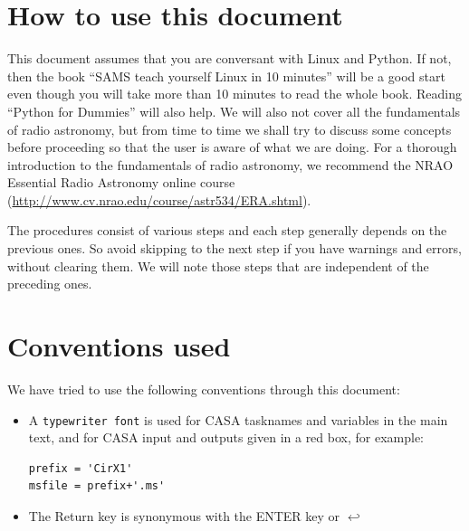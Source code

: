 \documentclass[force,almostfull,justified]{tufte-book}
\begin{document}
\section{How to use this document}

This document assumes that you are conversant with Linux and Python. If not, then the book ``SAMS
teach yourself Linux in 10 minutes'' will be a good start even though you will take more than 10
minutes to read the whole book.  Reading ``Python for Dummies'' will also help. We will also not cover
all the fundamentals of radio astronomy, but from time to time we shall try to discuss some concepts
before proceeding so that the user is aware of what we are doing.  For a thorough introduction to the
fundamentals of radio astronomy, we recommend the NRAO Essential Radio Astronomy online course
(\url{http://www.cv.nrao.edu/course/astr534/ERA.shtml}).

The procedures consist of various steps and each step generally depends on the previous ones. So avoid
skipping to the next step if you have warnings and errors, without clearing them.  We will note those
steps that are independent of the preceding ones.


\section{Conventions used}
We have tried to use the following conventions through this document:

\begin{itemize}

\item A {\tt typewriter font} is used for CASA tasknames and variables in the main text, and for CASA
input and outputs given in a red box, for example:

\begin{casacmd}
\begin{verbatim}
prefix = 'CirX1'
msfile = prefix+'.ms' 
\end{verbatim}
\end{casacmd}

\item The Return key is synonymous with the ENTER key or $\hookleftarrow$

\end{itemize}



\end{document}
